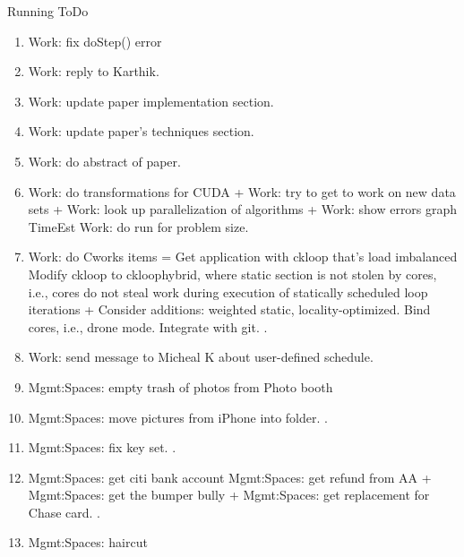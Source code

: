 \begin{columns}
\begin{column}{0.5\linewidth}
\begin{block}{Running ToDo}
\begin{enumerate}
\item \tiny Work: fix doStep() error 

\item \tiny Work: reply to Karthik. 

\item \tiny Work: update paper implementation section. 

\item \tiny Work: update paper's techniques section. 

\item \tiny Work: do abstract of paper.  


        \item \tiny Work: do transformations for CUDA + Work: try to
          get to work on new data sets + Work: look up parallelization
          of algorithms + Work: show errors  graph TimeEst 
          Work: do run for problem size.  

        \item \tiny Work: do Cworks items = Get application with
          ckloop that’s load imbalanced Modify ckloop to ckloophybrid, where
          static section is not stolen by cores, i.e., cores do not steal
          work during execution of statically scheduled loop iterations +
          Consider additions: weighted static, locality-optimized. Bind
          cores, i.e., drone mode. Integrate with git.  
           .
 
        \item \tiny Work: send message to Micheal K about user-defined
          schedule. 

        \item \tiny Mgmt:Spaces: empty trash of photos from Photo booth 

        \item \tiny Mgmt:Spaces: move pictures from iPhone into folder. . 

        \item \tiny Mgmt:Spaces: fix key set. . 

        \item \tiny Mgmt:Spaces: get citi bank account
          Mgmt:Spaces: get refund from AA  + Mgmt:Spaces: get the
          bumper bully +  Mgmt:Spaces: get replacement for Chase card. .

        \item \tiny Mgmt:Spaces: haircut   


\end{enumerate}
\end{block}
\end{column}
\end{columns}

